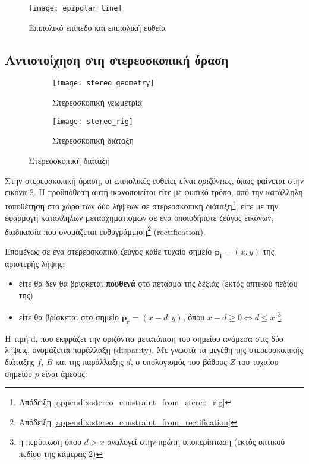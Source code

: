 \begin{figure}
	\centering
	\texttt{[image: epipolar\_line]}
	\caption{Επιπολικό επίπεδο και επιπολική ευθεία}
	\label{fig:epipolar_line}
\end{figure}


\subsection{Αντιστοίχηση στη στερεοσκοπική όραση}

\begin{figure}
	\centering
	\begin{subfigure}{0.48\textwidth}
		\texttt{[image: stereo\_geometry]}
		\caption{Στερεοσκοπική γεωμετρία}
		\label{fig:stereo_geometry}
	\end{subfigure}
	\begin{subfigure}{0.48\textwidth}
		\texttt{[image: stereo\_rig]}
		\caption{Στερεοσκοπική διάταξη}
		\label{fig:stereo_rig}
	\end{subfigure}
\end{figure}

Στην στερεοσκοπική όραση, οι επιπολικές ευθείες είναι \emph{οριζόντιες}, όπως φαίνεται στην εικόνα \ref{fig:stereo_geometry}. Η προϋπόθεση αυτή ικανοποιείται είτε με φυσικό τρόπο, από την κατάλληλη τοποθέτηση στο χώρο των δύο λήψεων σε στερεοσκοπική διάταξη\footnote{Απόδειξη \ref{appendix:stereo_constraint_from_stereo_rig}}, είτε με την εφαρμογή κατάλληλων μετασχηματισμών σε ένα οποιοδήποτε ζεύγος εικόνων, διαδικασία που ονομάζεται ευθυγράμμιση\footnote{\g Απόδειξη \ref{appendix:stereo_constraint_from_rectification}} \e(rectification).\g

Επομένως σε ένα στερεοσκοπικό ζεύγος κάθε τυχαίο σημείο $\mathbf{p_l} = (x,y)$ της αριστερής λήψης:

\begin{itemize}
	\item είτε θα δεν θα βρίσκεται \textbf{πουθενά} στο πέτασμα της δεξιάς (εκτός οπτικού πεδίου της)
	\item είτε θα βρίσκεται στο σημείο $\mathbf{p_r} = (x-d,y)$, όπου $x-d\geq0\Leftrightarrow d \leq x$ \footnote{η περίπτωση όπου $d>x$ αναλογεί στην πρώτη υποπερίπτωση (εκτός οπτικού πεδίου της κάμερας 2)}
\end{itemize}
  
Η τιμή \e d, \g που εκφράζει την οριζόντια μετατόπιση του σημείου ανάμεσα στις δύο λήψεις, ονομάζεται παράλλαξη \e(disparity). \g Με γνωστά τα μεγέθη της στερεοσκοπικής διάταξης $f$, $B$ και της παράλλαξης $d$, ο υπολογισμός του βάθους $Ζ$ του τυχαίου σημείου $p$ είναι άμεσος:

